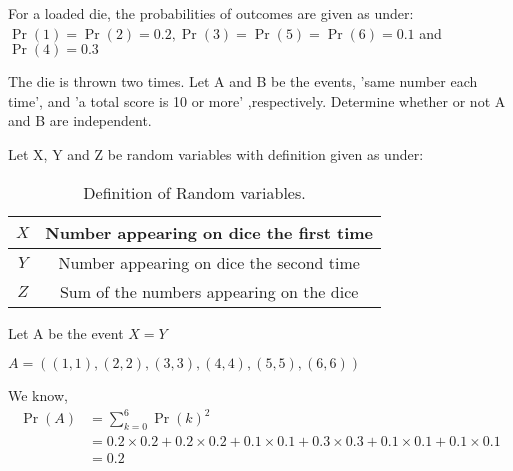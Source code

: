 \documentclass[]{article}
\begin{document}
\providecommand{\qfunc}[1]{\ensuremath{Q\left(#1\right)}}
\providecommand{\gauss}[2]{\mathcal{N}\ensuremath{\left(#1,#2\right)}}
\providecommand{\diff}[2]{\ensuremath{\frac{d{#1}}{d{#2}}}}
\providecommand{\myceil}[1]{\left \lceil #1 \right \rceil }
\newcommand\figref{Fig.~\ref}
\newcommand\tabref{Table~\ref}
\newcommand{\sinc}{\,\text{sinc}\,}
\newcommand{\rect}{\,\text{rect}\,}

\let\vec\mathbf

For a loaded die, the probabilities of outcomes are given as under:
$\Pr(1) = \Pr(2) = 0.2, \Pr(3) = \Pr(5) = \Pr(6) = 0.1$ and $\Pr(4) = 0.3$

The die is thrown two times. Let A and B be the events, 'same number each time', and
'a total score is 10 or more' ,respectively. Determine whether or not A and B are independent.

\solution
Let X, Y and Z be random variables with definition given as under:

\begin{table}[H]
\centering
\begin{tabular}{|c|c|}
    \hline
    $X$ & Number appearing on dice the first time\\
    \hline
    $Y$ & Number appearing on dice the second time\\
    \hline
    $Z$ & Sum of the numbers appearing on the dice\\
    \hline
\end{tabular}
\label{tab:ncert/12/13/3/1/}
\caption{Definition of Random variables.}
\end{table}

Let A be the event $X = Y$

$A = ((1,1), (2,2), (3,3), (4,4), (5,5), (6,6))$

We know,
\begin{align}
\Pr(A) &= \sum_{k=0}^6{\Pr(k)}^2 \\
&= 0.2 \times 0.2 + 0.2 \times 0.2 + 0.1 \times 0.1 + 0.3 \times 0.3 + 0.1 \times 0.1 + 0.1 \times 0.1\\
&= 0.2
\end{align}
\end{document}
